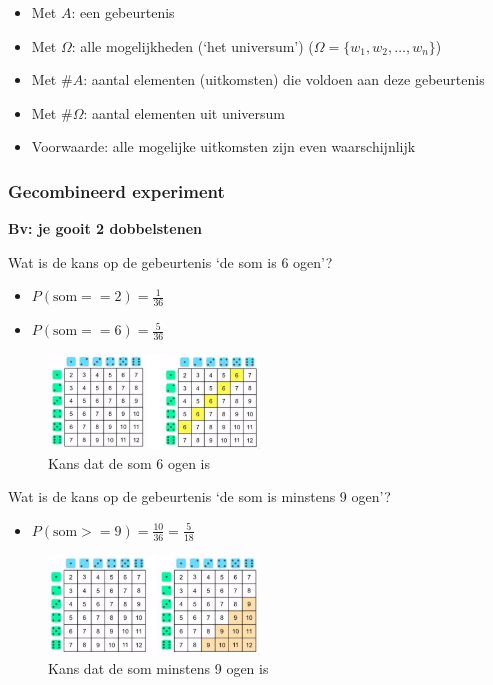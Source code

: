 \documentclass{article}
\begin{document}
\begin{itemize}
    \item Met $A$: een gebeurtenis
    \item Met $\Omega$: alle mogelijkheden (`het universum') ($\Omega = \{w_1, w_2, \dots, w_n\}$)
    \item Met $\#A$: aantal elementen (uitkomsten) die voldoen aan deze gebeurtenis
    \item Met $\#\Omega$: aantal elementen uit universum
    \item Voorwaarde: alle mogelijke uitkomsten zijn even waarschijnlijk
\end{itemize}

\subsubsection{Gecombineerd experiment}

\textbf{Bv: je gooit 2 dobbelstenen}

Wat is de kans op de gebeurtenis `de som is 6 ogen'?

\begin{itemize}
    \item $P(\text{som} == 2) = \frac{1}{36}$
    \item $P(\text{som} == 6) = \frac{5}{36}$
\end{itemize}

\begin{figure}[H]
    \centering
    \includegraphics[width=0.5\textwidth]{gecombineerd-experiment.png}
    \caption{Kans dat de som 6 ogen is}
\end{figure}

Wat is de kans op de gebeurtenis `de som is minstens 9 ogen'?

\begin{itemize}
    \item $P(\text{som} >= 9) = \frac{10}{36} = \frac{5}{18}$
\end{itemize}

\begin{figure}[H]
    \centering
    \includegraphics[width=0.5\textwidth]{gecombineerd-experiment2.png}
    \caption{Kans dat de som minstens 9 ogen is}
\end{figure}
\end{document}
